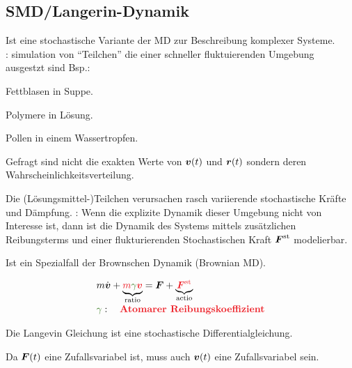 \subsection{SMD/Langerin-Dynamik}
\label{subsec:SMD/LangerinDynamik}
\begin{sectionbox}[Einführung]\nospacing
  Ist eine stochastische Variante der MD zur Beschreibung komplexer Systeme.\\
  : simulation von ``Teilchen'' die einer schneller fluktuierenden Umgebung ausgestzt sind Bsp.:
  \begin{numberlist}
    \item Fettblasen in Suppe.
    \item Polymere in Lösung.
    \item Pollen in einem Wassertropfen.
    \item   Gefragt sind nicht die exakten Werte von $\boldsymbol v (t)$ und $\boldsymbol r (t)$ sondern deren Wahrscheinlichkeitsverteilung.
  \end{numberlist}
  Die (Lösungsmittel-)Teilchen verursachen rasch variierende stochastische Kräfte und Dämpfung.
  : Wenn die explizite Dynamik dieser Umgebung nicht von Interesse ist, dann ist die Dynamik des Systems mittels zusätzlichen
    Reibungsterms und einer flukturierenden Stochastischen Kraft $\boldsymbol F ^{\text{st}}$ modelierbar. 
\end{sectionbox}
\begin{notebox}[Nebenbemerkung]
  Ist ein Spezialfall der Brownschen Dynamik (Brownian MD).
\end{notebox}
\begin{lawbox}\nospacing
  \begin{law}
    \begin{align}
      &m\dot{\vvec}+\underbrace{\rd{m\gammac\vvec}}_{\mathclap{\text{ratio}}}=\Fvec+\underbrace{\rd{\Fvecst}}_{\mathclap{\text{actio}}}\nalign
      &\gammac:\quad \text{\rdb{Atomarer Reibungskoeffizient}}\label{eq:atomarerReibungskoeffizient}
    \end{align}
  \end{law}
\end{lawbox}
\begin{notebox}[Bemerkungen]
  \begin{numberlist}
      \item Die Langevin Gleichung ist eine stochastische Differentialgleichung.
      \item Da $\boldsymbol F (t)$ eine Zufallsvariabel ist, muss auch $\boldsymbol v (t)$ eine Zufallsvariabel sein.
  \end{numberlist}
\end{notebox}
